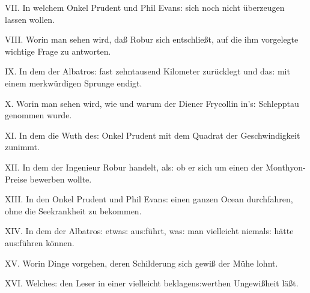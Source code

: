 \documentclass[oneside,12pt]{book}
\newenvironment{antiqua}{\normalfont}{}
\newcommand{\s}{s:}
\begin{document}
\begin{antiqua}VII.\end{antiqua} In welchem Onkel Prudent und Phil
Evan{\s} sich noch nicht \"uberzeugen lassen
wollen.~\dotfill\pageref{kap07}

\begin{antiqua}VIII.\end{antiqua} Worin man sehen wird, da{\ss} Robur
sich entschlie{\ss}t, auf die ihm vorgelegte wichtige Frage zu
antworten.~\dotfill\pageref{kap08}

\begin{antiqua}IX.\end{antiqua} In dem der {\glqq}Albatro{\s}{\grqq}
fast zehntausend Kilometer zur\"ucklegt und da{\s} mit einem
merkw\"urdigen Sprunge endigt.~\dotfill\pageref{kap09}

\begin{antiqua}X.\end{antiqua} Worin man sehen wird, wie und warum
der Diener Frycollin in'{\s} Schlepptau genommen
wurde.~\dotfill\pageref{kap10}

\begin{antiqua}XI.\end{antiqua} In dem die Wuth de{\s} Onkel Prudent
mit dem Quadrat der Geschwindigkeit zunimmt.~\dotfill\pageref{kap11}

\begin{antiqua}XII.\end{antiqua} In dem der Ingenieur Robur handelt,
al{\s} ob er sich um einen der Monthyon-Preise bewerben
wollte.~\dotfill\pageref{kap12}

\begin{antiqua}XIII.\end{antiqua} In den Onkel Prudent und Phil
Evan{\s} einen ganzen Ocean durchfahren, ohne die Seekrankheit zu
bekommen.~\dotfill\pageref{kap13}

\begin{antiqua}XIV. \end{antiqua} In dem der {\glqq}Albatro{\s}{\grqq}
etwa{\s} au{\s}f\"uhrt, wa{\s} man vielleicht niemal{\s} h\"atte
au{\s}f\"uhren k\"onnen.~\dotfill\pageref{kap14}

\begin{antiqua}XV.\end{antiqua} Worin Dinge vorgehen, deren
Schilderung sich gewi{\ss} der M\"uhe lohnt.~\dotfill\pageref{kap15}

\begin{antiqua}XVI.\end{antiqua} Welche{\s} den Leser in einer
vielleicht beklagen{\s}werthen Ungewi{\ss}heit
l\"a{\ss}t.~\dotfill\pageref{kap16}
\end{document}
